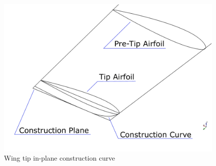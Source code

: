 % 
\begin{figure}[H]
\centering
\includegraphics[scale=0.37]{Immagini/Capitolo3/wingtip_2}
\caption{Wing tip in-plane construction curve}
\label{fig:WingTip1}
\end{figure}
% 

